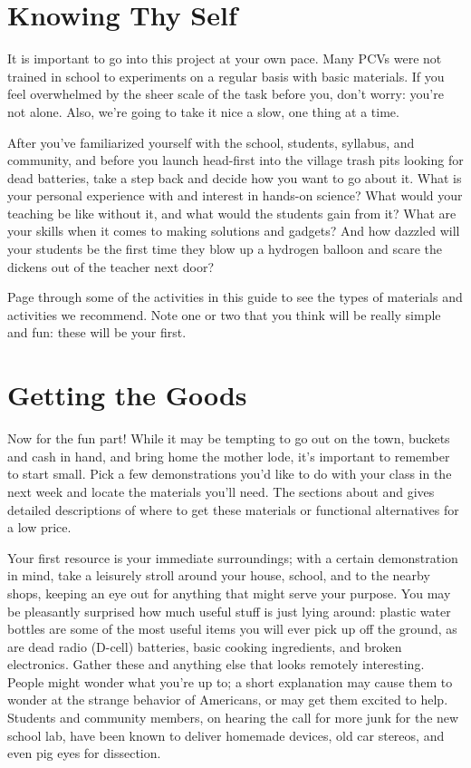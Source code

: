 \section{Knowing Thy Self}
It is important to go into this project at your own pace.  Many PCVs were not trained in school to experiments on a regular basis with basic materials.  If you feel overwhelmed by the sheer scale of the task before you, don’t worry: you’re not alone.  Also, we’re going to take it nice a slow, one thing at a time.

After you’ve familiarized yourself with the school, students, syllabus, and community, and before you launch head-first into the village trash pits looking for dead batteries, take a step back and decide how you want to go about it.  What is your personal experience with and interest in hands-on science?  What would your teaching be like without it, and what would the students gain from it?  What are your skills when it comes to making solutions and gadgets?  And how dazzled will your students be the first time they blow up a hydrogen balloon and scare the dickens out of the teacher next door?

Page through some of the activities in this guide to see the types of materials and activities we recommend.  Note one or two that you think will be really simple and fun: these will be your first.

\section{Getting the Goods}
Now for the fun part!  While it may be tempting to go out on the town, buckets and cash in hand, and bring home the mother lode, it’s important to remember to start small.  Pick a few demonstrations you’d like to do with your class in the next week and locate the materials you’ll need.  The sections about  and  gives detailed descriptions of where to get these materials or functional alternatives for a low price.

Your first resource is your immediate surroundings; with a certain demonstration in mind, take a leisurely stroll around your house, school, and to the nearby shops, keeping an eye out for anything that might serve your purpose.  You may be pleasantly surprised how much useful stuff is just lying around: plastic water bottles are some of the most useful items you will ever pick up off the ground, as are dead radio (D-cell) batteries, basic cooking ingredients, and broken electronics.  Gather these and anything else that looks remotely interesting.  People might wonder what you’re up to; a short explanation may cause them to wonder at the strange behavior of Americans, or may get them excited to help.  Students and community members, on hearing the call for more junk for the new school lab, have been known to deliver homemade devices, old car stereos, and even pig eyes for dissection.

